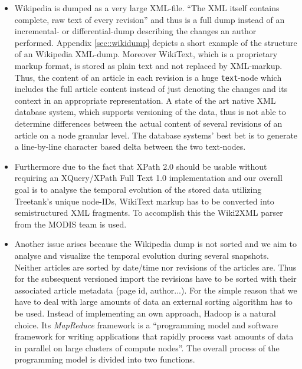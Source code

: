\begin{itemize}
\item Wikipedia is dumped as a very large XML-file. ``The XML itself contains complete, raw text of every revision''\cite{WikiDump} and thus is a full dump instead of an incremental- or differential-dump describing the changes an author performed. Appendix \ref{sec::wikidump} depicts a short example of the structure of an Wikipedia XML-dump. Moreover WikiText, which is a proprietary markup format, is stored as plain text and not replaced by XML-markup. Thus, the content of an article in each revision is a huge \texttt{text}-node which includes the full article content instead of just denoting the changes and its context in an appropriate representation. A state of the art native XML database system, which supports versioning of the data, thus is not able to determine differences between the actual content of several revisions of an article on a node granular level. The database systems' best bet is to generate a line-by-line character based delta between the two text-nodes.

\item Furthermore due to the fact that XPath 2.0 should be usable without requiring an XQuery/XPath Full Text 1.0 implementation and our overall goal is to analyse the temporal evolution of the stored data utilizing Treetank's unique node-IDs, WikiText markup has to be converted into semistructured XML fragments. To accomplish this the Wiki2XML parser from the MODIS team \cite{Wiki2XML} is used.

\item Another issue arises because the Wikipedia dump is not sorted and we aim to analyse and visualize the temporal evolution during several snapshots. Neither articles are sorted by date/time nor revisions of the articles are. Thus for the subsequent versioned import the revisions have to be sorted with their associated article metadata (page id, author...). For the simple reason that we have to deal with large amounts of data an external sorting algorithm has to be used. Instead of implementing an own approach, Hadoop is a natural choice. Its \emph{MapReduce}\cite{Hadoop} framework is a ``programming model and software framework for writing applications that rapidly process vast amounts of data in parallel on large clusters of compute nodes''. The overall process of the programming model is divided into two functions.
\end{itemize}

